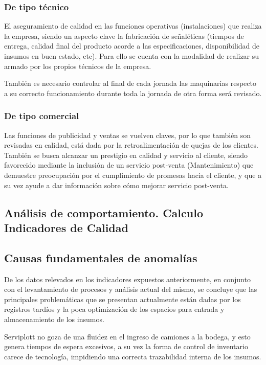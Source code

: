       	\subsubsection{De tipo técnico}
      	
			El aseguramiento de calidad en las funciones operativas (instalaciones) que realiza la empresa, siendo un aspecto clave la fabricación de señaléticas (tiempos de entrega, calidad final del producto acorde a las especificaciones, disponibilidad de insumos en buen estado, etc). Para ello se cuenta con la modalidad de realizar su armado por los propios técnicos de la empresa.
	
	
	También es necesario controlar al final de cada jornada las maquinarias respecto a su correcto funcionamiento durante toda la jornada de otra forma será revisado.
	
	
	\subsubsection{De tipo comercial}
	
	Las funciones de publicidad y ventas se vuelven claves, por lo que también son revisadas en calidad, está dada por la retroalimentación de quejas de los clientes. También se busca alcanzar un prestigio en calidad y servicio al cliente, siendo favorecido mediante la inclusión de un servicio post-venta (Mantenimiento) que demuestre preocupación por el cumplimiento de promesas hacia el cliente, y que a su vez ayude a dar información sobre cómo mejorar servicio post-venta.
	
	\subsection{Análisis de comportamiento. Calculo Indicadores de Calidad}
	\subsection{Causas fundamentales de anomalías}
	De los datos relevados en los indicadores expuestos anteriormente, en conjunto con el levantamiento de procesos y análisis actual del mismo, se concluye que las principales problemáticas que se presentan actualmente están dadas por los registros tardíos y la poca optimización de los espacios para entrada y almacenamiento de los insumos.
	
	
	Serviplott no goza de una fluidez en el ingreso de camiones a la bodega, y esto genera tiempos de espera excesivos, a su vez la forma de control de inventario carece de tecnología, impidiendo una correcta trazabilidad interna de los insumos.
	

